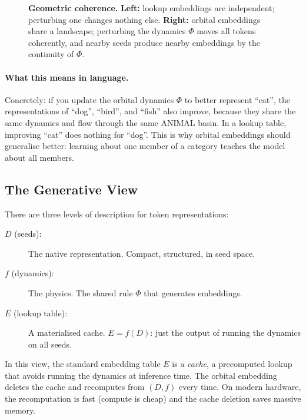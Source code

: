 \documentclass[11pt, a4paper]{article}
\theoremstyle{remark}
\begin{document}
\begin{figure}[h]
\caption{\textbf{Geometric coherence.}
\textbf{Left:} lookup embeddings are independent; perturbing one changes nothing else.
\textbf{Right:} orbital embeddings share a landscape; perturbing the dynamics $\Phi$ moves all tokens coherently, and nearby seeds produce nearby embeddings by the continuity of $\Phi$.}
\label{fig:geometric-coherence}
\end{figure}

\paragraph{What this means in language.}
Concretely: if you update the orbital dynamics $\Phi$ to better represent ``cat'', the representations of ``dog'', ``bird'', and ``fish'' also improve, because they share the same dynamics and flow through the same ANIMAL basin.
In a lookup table, improving ``cat'' does nothing for ``dog''.
This is why orbital embeddings should generalise better: learning about one member of a category teaches the model about all members.

\subsection{The Generative View}

There are three levels of description for token representations:
\begin{description}
    \item[$D$ (seeds):] The native representation. Compact, structured, in seed space.
    \item[$f$ (dynamics):] The physics. The shared rule $\Phi$ that generates embeddings.
    \item[$E$ (lookup table):] A materialised cache. $E = f(D)$: just the output of running the dynamics on all seeds.
\end{description}
In this view, the standard embedding table $E$ is a \emph{cache}, a precomputed lookup that avoids running the dynamics at inference time.
The orbital embedding deletes the cache and recomputes from $(D, f)$ every time.
On modern hardware, the recomputation is fast (compute is cheap) and the cache deletion saves massive memory.
\end{document}
